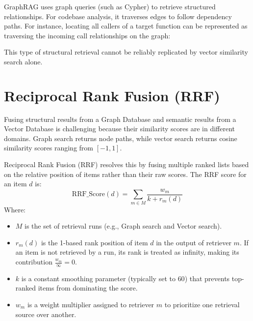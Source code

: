 \documentclass[12pt,a4paper,oneside]{report}
\begin{document}
GraphRAG uses graph queries (such as Cypher) to retrieve structured relationships. For codebase analysis, it traverses edges to follow dependency paths. For instance, locating all callers of a target function can be represented as traversing the incoming call relationships on the graph:
\begin{center}
\end{center}
This type of structural retrieval cannot be reliably replicated by vector similarity search alone.

\section{Reciprocal Rank Fusion (RRF)}
Fusing structural results from a Graph Database and semantic results from a Vector Database is challenging because their similarity scores are in different domains. Graph search returns node paths, while vector search returns cosine similarity scores ranging from $[-1, 1]$.

Reciprocal Rank Fusion (RRF) resolves this by fusing multiple ranked lists based on the relative position of items rather than their raw scores. The RRF score for an item $d$ is:
\begin{equation}
    \text{RRF\_Score}(d) = \sum_{m \in M} \frac{w_m}{k + r_m(d)}
\end{equation}
Where:
\begin{itemize}
    \item $M$ is the set of retrieval runs (e.g., Graph search and Vector search).
    \item $r_m(d)$ is the 1-based rank position of item $d$ in the output of retriever $m$. If an item is not retrieved by a run, its rank is treated as infinity, making its contribution $\frac{w_m}{\infty} = 0$.
    \item $k$ is a constant smoothing parameter (typically set to $60$) that prevents top-ranked items from dominating the score.
    \item $w_m$ is a weight multiplier assigned to retriever $m$ to prioritize one retrieval source over another.
\end{itemize}
\end{document}
